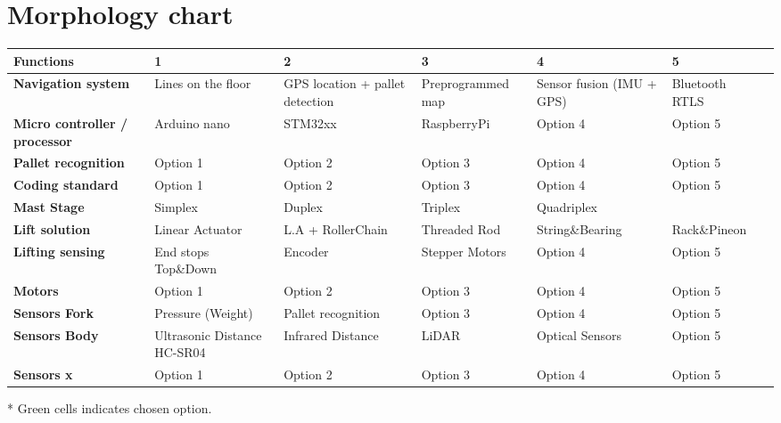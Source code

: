 \documentclass[landscape]{article}
\begin{document}
\section{Morphology chart}
\begin{table}[H]
    \begin{center}
        \begin{tabularx}{\linewidth}{L|L|L|L|L|L|L}
            \textbf{Functions} & \textbf{1} & \textbf{2}& \textbf{3} & 
            \textbf{4} & \textbf{5} \\
            \hline
            \textbf{Navigation system} & Lines on the floor & GPS location + pallet detection & Preprogrammed map  & Sensor fusion (IMU + GPS) & 
            Bluetooth RTLS \\
            \hline
            \textbf{Micro controller / processor} & Arduino nano & STM32xx & RaspberryPi& Option 4 & 
            Option 5 \\
            \hline
            \textbf{Pallet recognition} & Option 1 & Option 2 & Option 3 & Option 4 & 
            Option 5 \\
            \hline
            \textbf{Coding standard} & Option 1 & Option 2 & Option 3 & Option 4 & 
            Option 5 \\
            \hline
            \textbf{Mast Stage} & Simplex & Duplex & Triplex & Quadriplex & 
            \\
            \hline
            \textbf{Lift solution} & Linear Actuator & L.A + RollerChain & Threaded Rod& String\&Bearing & Rack\&Pineon \\
            \hline
            \textbf{Lifting sensing} & End stops Top\&Down & Encoder & Stepper Motors & Option 4 & 
            Option 5 \\
            \hline
            \textbf{Motors} & Option 1 & Option 2 & Option 3 & Option 4 & 
            Option 5 \\
            \hline
            \textbf{Sensors Fork} & Pressure (Weight) & Pallet recognition & Option 3 & Option 4 & 
            Option 5 \\
            \hline
            \textbf{Sensors Body} & Ultrasonic Distance HC-SR04 & Infrared Distance & LiDAR & Optical Sensors & 
            Option 5 \\
            \hline
            \textbf{Sensors x} & Option 1 & Option 2 & Option 3 & Option 4 & 
            Option 5 \\
            \hline
        \end{tabularx}
    \end{center}
\end{table}
* Green cells indicates chosen option.
\end{document}
